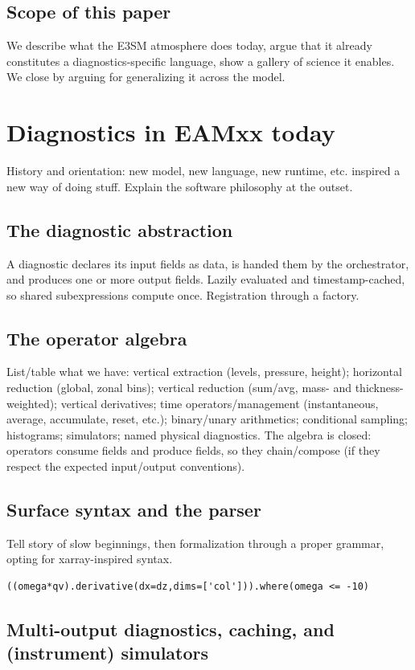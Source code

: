 \documentclass[gmd, manuscript]{copernicus}
\begin{document}
\subsection{Scope of this paper}
We describe what the E3SM atmosphere does today, argue that it already constitutes a
diagnostics-specific language, show a gallery of science it enables.
We close by arguing for generalizing it across the model.


\section{Diagnostics in EAMxx today}
History and orientation: new model, new language, new runtime, etc. inspired a new way of doing stuff.
Explain the software philosophy at the outset.

\subsection{The diagnostic abstraction}
A diagnostic declares its input fields as data, is handed them by the orchestrator, and
produces one or more output fields.
Lazily evaluated and timestamp-cached, so shared subexpressions
compute once.
Registration through a factory.

\subsection{The operator algebra}
List/table what we have:
vertical extraction (levels, pressure, height);
horizontal reduction (global, zonal bins);
vertical reduction (sum/avg, mass- and thickness-weighted);
vertical derivatives;
time operators/management (instantaneous, average, accumulate, reset, etc.);
binary/unary arithmetics;
conditional sampling;
histograms;
simulators;
named physical diagnostics.
The algebra is closed: operators consume fields and produce fields, so they chain/compose (if they respect the expected input/output conventions).

\subsection{Surface syntax and the parser}
Tell story of slow beginnings, then formalization through a proper grammar, opting for xarray-inspired syntax.
\begin{verbatim}
((omega*qv).derivative(dx=dz,dims=['col'])).where(omega <= -10)
\end{verbatim}

\subsection{Multi-output diagnostics, caching, and (instrument) simulators}
\end{document}
